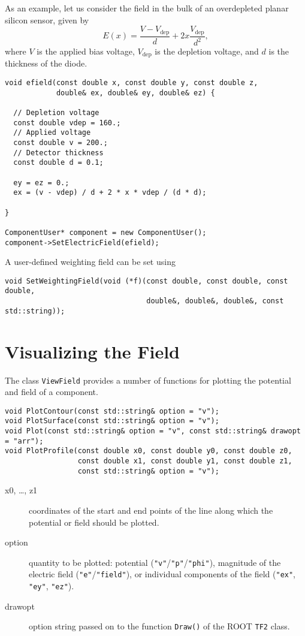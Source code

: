 As an example, let us consider the field in the bulk of an overdepleted 
planar silicon sensor, given by
\begin{equation*}
E\left(x\right) = \frac{V - V_{\text{dep}}}{d} + 
                    2x \frac{V_{\text{dep}}}{d^{2}},
\end{equation*}
where \(V\) is the applied bias voltage, \(V_{\text{dep}}\) is 
the depletion voltage, and \(d\) is the thickness of the diode.
\begin{lstlisting}
void efield(const double x, const double y, const double z,
            double& ex, double& ey, double& ez) {

  // Depletion voltage
  const double vdep = 160.;
  // Applied voltage
  const double v = 200.;
  // Detector thickness
  const double d = 0.1;

  ey = ez = 0.;
  ex = (v - vdep) / d + 2 * x * vdep / (d * d);

}

ComponentUser* component = new ComponentUser();
component->SetElectricField(efield);

\end{lstlisting}

A user-defined weighting field can be set using
\begin{lstlisting}
void SetWeightingField(void (*f)(const double, const double, const double,
                                 double&, double&, double&, const std::string));
\end{lstlisting}

\section{Visualizing the Field}

The class \texttt{ViewField} provides a number of functions 
for plotting the potential and field of a component. 
\begin{lstlisting}
void PlotContour(const std::string& option = "v");
void PlotSurface(const std::string& option = "v");
void Plot(const std::string& option = "v", const std::string& drawopt = "arr");
void PlotProfile(const double x0, const double y0, const double z0,
                 const double x1, const double y1, const double z1,
                 const std::string& option = "v");
\end{lstlisting}
\begin{description}
  \item[x0, \dots, z1]
  coordinates of the start and end points of the line along which 
  the potential or field should be plotted.
  \item[option] 
  quantity to be plotted: potential 
  (\texttt{"v"}/\texttt{"p"}/\texttt{"phi"}), 
  magnitude of the electric field (\texttt{"e"}/\texttt{"field"}), 
  or individual components of the field (\texttt{"ex"}, \texttt{"ey"},
  \texttt{"ez"}).
  \item[drawopt] 
  option string passed on to the function \texttt{Draw()} of the 
  ROOT \texttt{TF2} class. 
\end{description}


